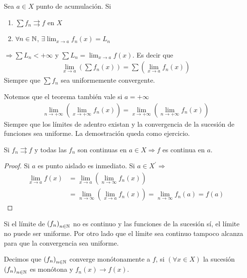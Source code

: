 \begin{corollary}
  Sea \(a \in X\) punto de acumulación. Si \begin{enumerate}
    \item \(\sum f_n \rightrightarrows f\) en \(X\)
    \item \(\forall n \in \mathbb{N} \), \(\exists \lim_{x \to a} f_n(x) = L_n\)
  \end{enumerate} \(\Rightarrow \sum L_n < +\infty \) y \(\sum L_n = \lim_{x \to a} f(x)\).
  Es decir que \begin{align*}
    \lim_{x \to a}\left(\sum f_n(x)\right) = \sum\left(\lim_{x \to a} f_n(x)\right)
  \end{align*} Siempre que \(\sum f_n\) sea uniformemente convergente.
\end{corollary}

Notemos que el teorema también vale si \(a = +\infty\)
\begin{align*}
  \lim_{n \to +\infty} \left(\lim_{x \to +\infty} f_n(x)\right) = \lim_{x \to +\infty}\left(\lim_{n \to +\infty} f_n(x)\right)
\end{align*}
Siempre que los límites de adentro existan y la convergencia de la sucesión de funciones sea uniforme. La demostración queda como ejercicio.

\begin{theorem}
  Si \(f_n \rightrightarrows f\) y todas las \(f_n\) son continuas en \(a \in X \Rightarrow f\) es continua en \(a\).
  \begin{proof}
    Si \(a\) es punto aislado es inmediato. Si \(a \in X^{\prime} \Rightarrow \) \begin{align*}
      \lim_{x \to a} f(x) & = \lim_{x \to a}\left(\lim_{n \to \infty} f_n(x)\right)                                     \\
                          & = \lim_{n \to \infty}\left(\lim_{x \to a} f_n(x)\right) = \lim_{n \to \infty} f_n(a) = f(a)
    \end{align*}
  \end{proof}
\end{theorem}

Si el límite de \({(f_n)}_{n \in \mathbb{N}} \) no es continuo y las funciones de la sucesión sí, el límite no puede ser uniforme. Por otro lado que el límite sea continuo tampoco alcanza para que la convergencia sea uniforme.

\begin{definition}
  Decimos que \({(f_n)}_{n \in \mathbb{N}} \) converge monótonamente a \(f\), si \((\forall x \in X)\) la sucesión \({(f_n)}_{n \in \mathbb{N}} \) es monótona y \(f_n(x) \to f(x)\).
\end{definition}

